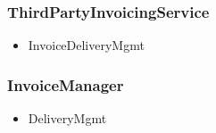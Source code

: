     \subsubsection{ThirdPartyInvoicingService}
        \begin{itemize}
            \item InvoiceDeliveryMgmt
        \end{itemize}

    \subsubsection{InvoiceManager}
        \begin{itemize}
            \item DeliveryMgmt
        \end{itemize}
